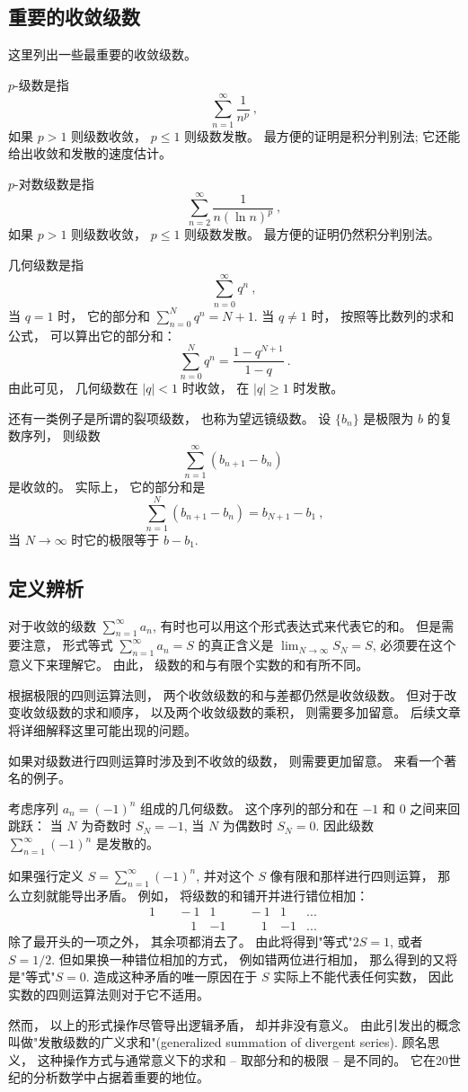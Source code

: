 \subsection{重要的收敛级数}

这里列出一些最重要的收敛级数。

$p$-级数是指
$$
\sum_{n=1}^\infty\frac{1}{n^p}~,
$$
如果 $p>1$ 则级数收敛， $p\leq1$ 则级数发散。 最方便的证明是积分判别法; 它还能给出收敛和发散的速度估计。

$p$-对数级数是指
$$
\sum_{n=2}^\infty\frac{1}{n(\ln n)^p}~,
$$
如果 $p>1$ 则级数收敛， $p\leq1$ 则级数发散。 最方便的证明仍然积分判别法。

几何级数是指
$$
\sum_{n=0}^\infty q^n~,
$$
当 $q=1$ 时， 它的部分和 $\sum_{n=0}^N q^n=N+1$. 当 $q\neq1$ 时， 按照等比数列的求和公式， 可以算出它的部分和：
$$
\sum_{n=0}^N q^n=\frac{1-q^{N+1}}{1-q}~.
$$
由此可见， 几何级数在 $|q|<1$ 时收敛， 在 $|q|\geq1$ 时发散。

还有一类例子是所谓的裂项级数， 也称为望远镜级数。 设 $\{b_n\}$ 是极限为 $b$ 的复数序列， 则级数
$$
\sum_{n=1}^\infty(b_{n+1}-b_n)~
$$
是收敛的。 实际上， 它的部分和是
$$
\sum_{n=1}^N(b_{n+1}-b_n)=b_{N+1}-b_1~,
$$
当 $N\to\infty$ 时它的极限等于 $b-b_1$.

\subsection{定义辨析}
对于收敛的级数 $\sum_{n=1}^\infty a_n$, 有时也可以用这个形式表达式来代表它的和。 但是需要注意， 形式等式 $\sum_{n=1}^\infty a_n=S$ 的真正含义是 $\lim_{N\to\infty}S_N=S$, 必须要在这个意义下来理解它。 由此， 级数的和与有限个实数的和有所不同。 

根据极限的四则运算法则， 两个收敛级数的和与差都仍然是收敛级数。 但对于改变收敛级数的求和顺序， 以及两个收敛级数的乘积， 则需要多加留意。 后续文章将详细解释这里可能出现的问题。

如果对级数进行四则运算时涉及到不收敛的级数， 则需要更加留意。 来看一个著名的例子。

\begin{example}{}
考虑序列 $a_n=(-1)^n$ 组成的几何级数。 这个序列的部分和在 $-1$ 和 $0$ 之间来回跳跃： 当 $N$ 为奇数时 $S_N=-1$, 当 $N$ 为偶数时 $S_N=0$. 因此级数 $\sum_{n=1}^\infty(-1)^n$ 是发散的。 

如果强行定义 $S=\sum_{n=1}^\infty(-1)^n$, 并对这个 $S$ 像有限和那样进行四则运算， 那么立刻就能导出矛盾。 例如， 将级数的和铺开并进行错位相加：
$$
\begin{aligned}
1 & \quad-1 & 1 & \quad-1 & 1 &...\\
  & \quad\quad1 & -1 & \quad\quad1 & -1 &...
\end{aligned}~
$$
除了最开头的一项之外， 其余项都消去了。 由此将得到"等式"$2S=1$, 或者 $S=1/2$. 但如果换一种错位相加的方式， 例如错两位进行相加， 那么得到的又将是"等式"$S=0$. 造成这种矛盾的唯一原因在于 $S$ 实际上不能代表任何实数， 因此实数的四则运算法则对于它不适用。

然而， 以上的形式操作尽管导出逻辑矛盾， 却并非没有意义。 由此引发出的概念叫做"发散级数的广义求和"(generalized summation of divergent series). 顾名思义， 这种操作方式与通常意义下的求和 -- 取部分和的极限 -- 是不同的。 它在20世纪的分析数学中占据着重要的地位。
\end{example}
